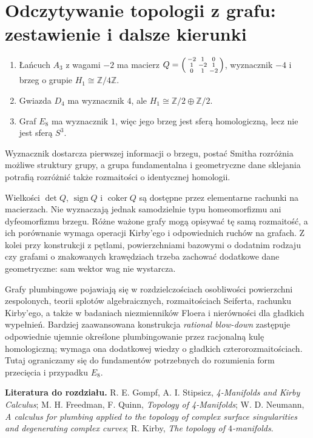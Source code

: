 \section{Odczytywanie topologii z grafu: zestawienie i dalsze kierunki}
\label{sec:tg-plumbing-conclusions}

\begin{przyklad}
\begin{enumerate}[label=(\roman*)]
\item Łańcuch $A_3$ z wagami $-2$ ma macierz
$Q=\begin{psmallmatrix}-2&1&0\\1&-2&1\\0&1&-2\end{psmallmatrix}$,
wyznacznik $-4$ i brzeg o grupie $H_1\cong\mathbb Z/4\mathbb Z$.
\item Gwiazda $D_4$ ma wyznacznik $4$, ale
$H_1\cong\mathbb Z/2\oplus\mathbb Z/2$.
\item Graf $E_8$ ma wyznacznik $1$, więc jego brzeg jest
sferą homologiczną, lecz nie jest sferą $S^3$.
\end{enumerate}
Wyznacznik dostarcza pierwszej informacji o brzegu,
postać Smitha rozróżnia możliwe struktury grupy,
a grupa fundamentalna i geometryczne dane sklejania
potrafią rozróżnić także rozmaitości o identycznej homologii.
\end{przyklad}

\begin{uwaga}
Wielkości $\det Q$, $\operatorname{sign}Q$ i
$\operatorname{coker}Q$ są dostępne przez elementarne rachunki
na macierzach. Nie wyznaczają jednak samodzielnie
typu homeomorfizmu ani dyfeomorfizmu brzegu.
Różne ważone grafy mogą opisywać tę samą rozmaitość,
a ich porównanie wymaga operacji Kirby'ego i odpowiednich
ruchów na grafach. Z kolei przy konstrukcji z pętlami,
powierzchniami bazowymi o dodatnim rodzaju czy grafami
o znakowanych krawędziach trzeba zachować dodatkowe
dane geometryczne: sam wektor wag nie wystarcza.
\end{uwaga}

\begin{uwaga}
Grafy plumbingowe pojawiają się w rozdzielczościach
osobliwości powierzchni zespolonych, teorii splotów
algebraicznych, rozmaitościach Seiferta, rachunku Kirby'ego,
a także w badaniach niezmienników Floera i nierówności
dla gładkich wypełnień. Bardziej zaawansowana konstrukcja
\emph{rational blow-down} zastępuje odpowiednie ujemnie
określone plumbingowanie przez racjonalną kulę homologiczną;
wymaga ona dodatkowej wiedzy o gładkich czterorozmaitościach.
Tutaj ograniczamy się do fundamentów potrzebnych do
rozumienia form przecięcia i przypadku $E_8$.
\end{uwaga}

\medskip
\noindent\textbf{Literatura do rozdziału.}
R. E. Gompf, A. I. Stipsicz, \emph{4-Manifolds and Kirby Calculus};
M. H. Freedman, F. Quinn, \emph{Topology of 4-Manifolds};
W. D. Neumann, \emph{A calculus for plumbing applied to the
topology of complex surface singularities and degenerating complex
curves}; R. Kirby, \emph{The topology of $4$-manifolds}.


